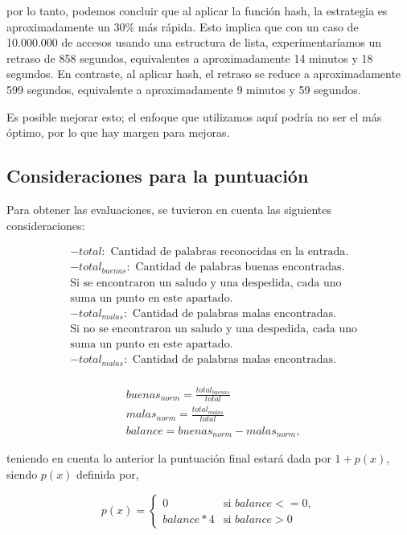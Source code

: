 \documentclass[10pt,times,twocolumn]{article}
\begin{document}
por lo tanto, podemos concluir que al aplicar la función hash, la estrategia es aproximadamente un 30\% más rápida. Esto implica que con un caso de 10.000.000 de accesos usando una estructura de lista, experimentaríamos un retraso de 858 segundos, equivalentes a aproximadamente 14 minutos y 18 segundos. En contraste, al aplicar hash, el retraso se reduce a aproximadamente 599 segundos, equivalente a aproximadamente 9 minutos y 59 segundos.

Es posible mejorar esto; el enfoque que utilizamos aquí podría no ser el más óptimo, por lo que hay margen para mejoras.

\subsection{Consideraciones para la puntuación}
Para obtener las evaluaciones, se tuvieron en cuenta las siguientes consideraciones:

\[
\begin{aligned}
& - total: \text{ Cantidad de palabras reconocidas en la entrada.} \\
& - total_{buenas}: \text{ Cantidad de palabras buenas encontradas.}\\
& \text{Si se encontraron un saludo y una despedida, cada uno}\\
& \text{suma un punto en este apartado.} \\
& - total_{malas}: \text{ Cantidad de palabras malas encontradas.}\\
& \text{Si no se encontraron un saludo y una despedida, cada uno}\\
& \text{suma un punto en este apartado.} \\
& - total_{malas}: \text{ Cantidad de palabras malas encontradas.}\\
\end{aligned}
\]

\[
\begin{aligned}
& buenas_{norm}=\frac{total_{buenas}}{total}\\
& malas_{norm}=\frac{total_{malas}}{total}\\
& balance = buenas_{norm} - malas_{norm},
\end{aligned}
\]

teniendo en cuenta lo anterior la puntuación final estará dada por \(1 + p(x)\), siendo \(p(x)\) definida por,

\[
p(x) =
\begin{cases}
0 & \text{si } balance <= 0, \\
balance*4 & \text{si } balance > 0
\end{cases}
\]
\end{document}
